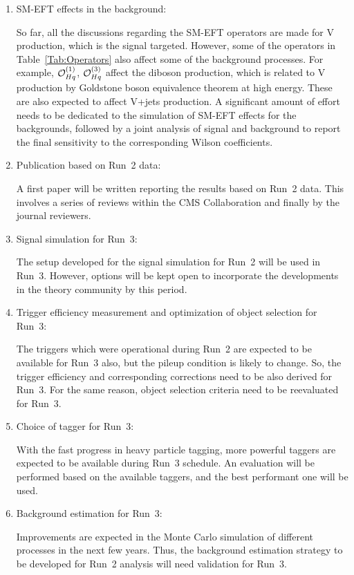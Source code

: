 \documentclass[a4paper,11pt]{article}
\renewcommand{\PV}{{{{V}}}\xspace}
\newcommand{\VH}{{{\PV}{\PH}}\xspace}
\begin{document}
{\begin{enumerate}
\item SM-EFT effects in the background:

So far, all the discussions regarding the SM-EFT operators are made for \VH production, which is the signal targeted. However, some of the operators in Table~\ref{Tab:Operators} also affect some of the background processes. 
For example, ${\cal O}^{(1)}_{Hq}$, ${\cal O}^{(3)}_{Hq}$ affect the diboson production, which is related to \VH production by Goldstone boson equivalence theorem at high energy. 
These are also expected to affect {\PV}+jets production. 
A significant amount of effort needs to be dedicated to the simulation of SM-EFT effects for the backgrounds, followed by a joint analysis of signal and background to report the final sensitivity to the corresponding Wilson coefficients. 

\item Publication based on Run~2 data:

A first paper will be written reporting the results based on Run~2 data. This involves a series of reviews within the CMS Collaboration and finally by the journal reviewers. 

\item Signal simulation for Run~3:

The setup developed for the signal simulation for Run~2 will be used in Run~3. However, options will be kept open to incorporate the developments in the theory community by this period. 

\item Trigger efficiency measurement and optimization of object selection for Run~3: 

The triggers which were operational during Run~2 are expected to be available for Run~3 also, but the pileup condition is likely to change. So, the trigger efficiency and corresponding corrections need to be also derived for Run~3. 
For the same reason, object selection criteria need to be reevaluated for Run~3. 

\item Choice of \PH tagger for Run~3:

With the fast progress in heavy particle tagging, more powerful taggers are expected to be available during Run~3 schedule. An evaluation will be performed based on the available taggers, and the best performant one will be used. 

\item Background estimation for Run~3:

Improvements are expected in the Monte Carlo simulation of different processes in the next few years. Thus, the background estimation strategy to be developed for Run~2 analysis will need validation for Run~3.


\end{enumerate}}
\end{document}
